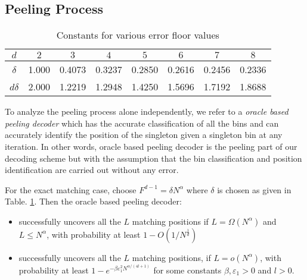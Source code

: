 \subsection{\bf Peeling Process}
\begin{table}[ht]
	\centering
	\begin{tabular}{ c  c  c  c  c  c  c  c  }
		\hline
		$d$ & $2$& $3$ & $4$ & $5$ & $6$ & $7$ & $8$ \\ \hline
		$\delta$ & 1.000 & 0.4073 & 0.3237 & 0.2850 & 0.2616 & 0.2456 & 0.2336 \\ 
		$d\delta$ & 2.000 & 1.2219 & 1.2948 & 1.4250 & 1.5696 & 1.7192 & 1.8688 \\ \hline
	\end{tabular}
	\vspace{1ex}
	\caption{Constants for various error floor values}
	\label{Table:EtaValues}
\end{table}
To analyze the peeling process alone independently, we refer to a {\it oracle based peeling decoder} which has the accurate classification of all the bins and can accurately  identify the position of the singleton given a singleton bin at any iteration. In other words, oracle based peeling decoder is the peeling part of our decoding scheme but with the assumption that the bin classification and position identification are carried out without any error.
\begin{lemma}
For the exact matching case, choose $F^{d-1}=\delta N^\alpha$ where $\delta$ is chosen as given in Table. \ref{Table:EtaValues}. Then the oracle based peeling decoder:
\begin{itemize}
\item successfully uncovers all the $L$ matching positions if $L=\Omega(N^{\alpha})$ and $L\leq N^{\alpha}$, with probability at least $1-O(1/N^{\frac{1}{d}})$
\item successfully uncovers all the $L$ matching positions, if $L=o(N^{\alpha})$, with probability at least $1-e^{-\beta \varepsilon_1^2N^{\alpha/(4l+1)}}$ for some constants $\beta,\varepsilon_1>0$ and $l>0.$
\end{itemize}\label{Lem:peeling_exact}
\end{lemma}
